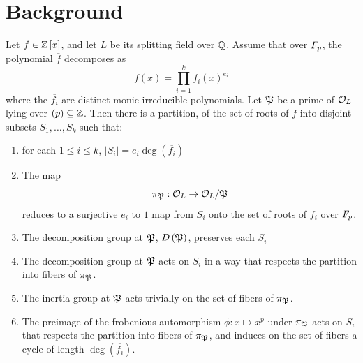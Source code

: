 \documentclass[../main.tex]{subfiles}
\begin{document}
\section{Background} 
\begin{lemma}
  \label{lem:structure-of-roots}
  Let $f \in \Z\left[ x \right]$, and let $L$ be its splitting field over $\Q$.
  Assume that over $\F_p$, the polynomial $\overline{f}$ decomposes as
  \[
    \overline{f}\left( x \right) = \prod_{i=1}^{k} \overline{f_i}\left( x \right)^{e_i}
  \]
  where the $\overline{f_i}$ are distinct monic irreducible polynomials.
  Let $\P$ be a prime of $\O_L$ lying over $\left( p \right) \subseteq \Z$.
  Then there is a partition, of the set of roots of $f$ into disjoint subsets $S_1, \ldots, S_k$ such that: 
  \begin{enumerate}
    \item for each $1 \leq i \leq k$, $\left| S_i \right| = e_i \deg\left( \overline{f_i} \right)$
    \item The map 
    \[
      \pi_{\P} : \O_L \to \O_L / \P
    \]
    reduces to a surjective $e_i$ to $1$ map from $S_i$ onto the set of roots of $\overline{f_i}$ over $\F_p$.
    \item The decomposition group at $\P$, $D\left( \P \right)$, preserves each $S_i$ 
    \item The decomposition group at $\P$ acts on $S_i$ in a way that respects the partition into fibers of $\pi_{\P}$.
    \item The inertia group at $\P$ acts trivially on the set of fibers of $\pi_{\P}$.
    \item The preimage of the frobenious automorphism $\phi : x \mapsto x^p$ under $\pi_{\P}$ acts on $S_i$ that respects the partition into fibers of $\pi_{\P}$, and induces on the set of fibers a cycle of length $\deg\left( \overline{f_i} \right)$.
  \end{enumerate}
\end{lemma}
\end{document}
